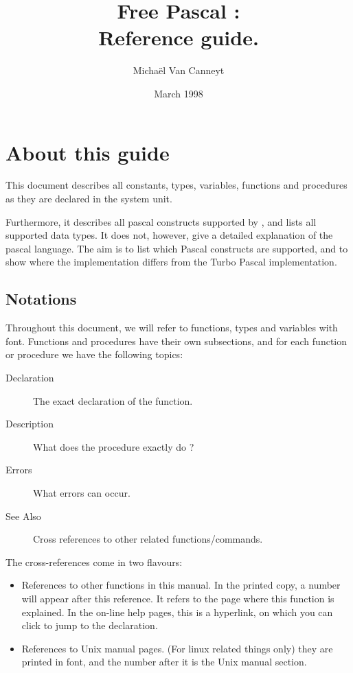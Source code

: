 \documentclass{report}
\begin{document}
\title{Free Pascal :\\ Reference guide.}
\date{March 1998}
\author{Micha\"el Van Canneyt
}
\maketitle
\tableofcontents
\newpage
\listoftables
\newpage
\section{About this guide}
This document describes all constants, types, variables, functions and
procedures as they are declared in the system unit.

Furthermore, it describes all pascal constructs supported by \fpc, and lists
all supported data types. It does not, however, give a detailed explanation
of the pascal language. The aim is to list which Pascal constructs are
supported, and to show where the \fpc implementation differs from the
Turbo Pascal implementation.

\subsection{Notations}
Throughout this document, we will refer to functions, types and variables
with  font. Functions and procedures have their own
subsections, and for each function or procedure we have the following 
topics:
\begin{description}
\item [Declaration] The exact declaration of the function.
\item [Description] What does the procedure exactly do ?
\item [Errors] What errors can occur.
\item [See Also] Cross references to other related functions/commands.
\end{description}
The cross-references come in two flavours:
\begin{itemize}
\item References to other functions in this manual. In the printed copy, a
number will appear after this reference. It refers to the page where this
function is explained. In the on-line help pages, this is a hyperlink, on
which you can click to jump to the declaration.
\item References to Unix manual pages. (For linux related things only) they
are printed in  font, and the number after it is the Unix
manual section.
\end{itemize}
\end{document}
